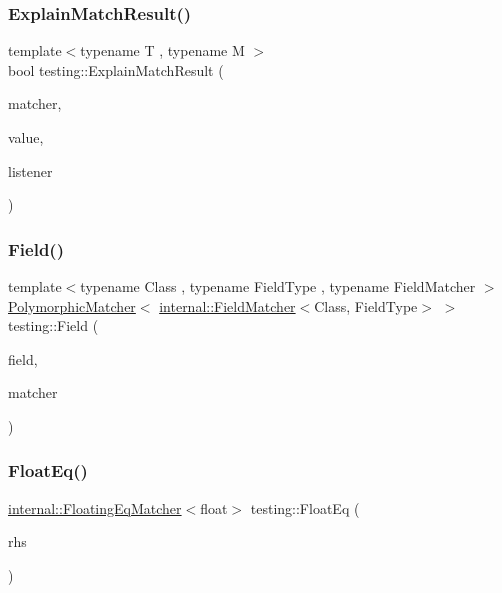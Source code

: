 \mbox{\label{namespacetesting_a6d5fbd5104dafc63bf705dafbcb5ce18}} 
\subsubsection{\texorpdfstring{Explain\+Match\+Result()}{ExplainMatchResult()}}
{\footnotesize\ttfamily template$<$typename T , typename M $>$ \\
bool testing\+::\+Explain\+Match\+Result (\begin{DoxyParamCaption}\item[{M}]{matcher,  }\item[{const T \&}]{value,  }\item[{\hyperlink{classtesting_1_1_match_result_listener}{Match\+Result\+Listener} $\ast$}]{listener }\end{DoxyParamCaption})\hspace{0.3cm}{\ttfamily [inline]}}

\mbox{\label{namespacetesting_a4df3849391696aa93ac3a7703a717c2a}} 
\subsubsection{\texorpdfstring{Field()}{Field()}}
{\footnotesize\ttfamily template$<$typename Class , typename Field\+Type , typename Field\+Matcher $>$ \\
\hyperlink{classtesting_1_1_polymorphic_matcher}{Polymorphic\+Matcher}$<$ \hyperlink{classtesting_1_1internal_1_1_field_matcher}{internal\+::\+Field\+Matcher}$<$Class, Field\+Type$>$ $>$ testing\+::\+Field (\begin{DoxyParamCaption}\item[{Field\+Type Class\+::$\ast$}]{field,  }\item[{const Field\+Matcher \&}]{matcher }\end{DoxyParamCaption})\hspace{0.3cm}{\ttfamily [inline]}}

\mbox{\label{namespacetesting_ac75507edb7998957b48fb17a9b8a020b}} 
\subsubsection{\texorpdfstring{Float\+Eq()}{FloatEq()}}
{\footnotesize\ttfamily \hyperlink{classtesting_1_1internal_1_1_floating_eq_matcher}{internal\+::\+Floating\+Eq\+Matcher}$<$float$>$ testing\+::\+Float\+Eq (\begin{DoxyParamCaption}\item[{float}]{rhs }\end{DoxyParamCaption})\hspace{0.3cm}{\ttfamily [inline]}}

